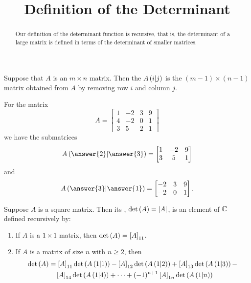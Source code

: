 \documentclass{ximera}
\title{Definition of the Determinant}
\begin{document}
\begin{abstract}
  Our definition of the determinant function is recursive, that is,
  the determinant of a large matrix is defined in terms of the
  determinant of smaller matrices.
\end{abstract}
\maketitle

\begin{definition}[SubMatrix]
  Suppose that $A$ is an $m\times n$ matrix.  Then the 
  $A\left(i|j\right)$ is the $(m-1)\times (n-1)$ matrix obtained
  from $A$ by removing row $i$ and column $j$.
\end{definition}

\begin{example}
  For the matrix
  \[
    A=
    \begin{bmatrix}
      1 & -2 & 3 & 9\\
      4 & -2 & 0 & 1\\
      3 & 5 & 2 & 1
    \end{bmatrix}
  \]
  we have the submatrices
  \[
    \submatrix{A}{\answer{2}}{\answer{3}}
    =
    \begin{bmatrix}
      1 & -2 & 9\\
      3 & 5 & 1
    \end{bmatrix}
  \]
  and
  \[
    \submatrix{A}{\answer{3}}{\answer{1}}
    =
    \begin{bmatrix}
      -2 & 3 & 9\\
      -2 & 0 & 1
    \end{bmatrix}.
  \]
\end{example}

\begin{definition}
  Suppose $A$ is a square matrix.  Then its ,
  $\det\left(A\right)=\left\lvert A\right\rvert$, is an element of $\mathbb{C}$ defined
  recursively by:
\begin{enumerate}
\item If $A$ is a $1\times 1$ matrix, then $\det\left(A\right)=\left\lbrack A\right\rbrack_{11}$.
\item If $A$ is a matrix of size $n$ with $n\geq 2$, then
  \begin{align*}
    \det\left(A\right)&=
                 \left\lbrack A\right\rbrack_{11}\det\left(A\left(1|1\right)\right)
                 -\left\lbrack A\right\rbrack_{12}\det\left(A\left(1|2\right)\right)
                 +\left\lbrack A\right\rbrack_{13}\det\left(A\left(1|3\right)\right)-\\
               &\quad \left\lbrack A\right\rbrack_{14}\det\left(A\left(1|4\right)\right)
                 +\cdots
                 +(-1)^{n+1}\left\lbrack A\right\rbrack_{1n}\det\left(A\left(1|n\right)\right)
  \end{align*}
\end{enumerate}
\end{definition}
\end{document}
